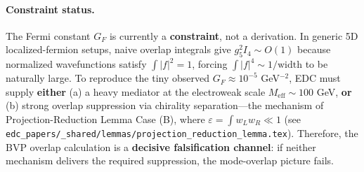 %
%
%
%

\paragraph{Constraint status.}
The Fermi constant $G_F$ is currently a \textbf{constraint}, not a derivation.
In generic 5D localized-fermion setups, naive overlap integrals give $g_5^2 I_4 \sim O(1)$
because normalized wavefunctions satisfy $\int |f|^2 = 1$, forcing $\int |f|^4 \sim 1/\text{width}$
to be naturally large.
To reproduce the tiny observed $G_F \approx 10^{-5}$ GeV$^{-2}$, EDC must supply
\textbf{either} (a) a heavy mediator at the electroweak scale $M_{\text{eff}} \sim 100$ GeV,
\textbf{or} (b) strong overlap suppression via chirality separation---the mechanism
of Projection-Reduction Lemma Case (B), where $\varepsilon = \int w_L w_R \ll 1$
(see \texttt{edc\_papers/\_shared/lemmas/projection\_reduction\_lemma.tex}).
Therefore, the BVP overlap calculation is a \textbf{decisive falsification channel}:
if neither mechanism delivers the required suppression, the mode-overlap picture fails.

